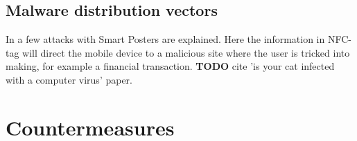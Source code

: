 

\subsection{Malware distribution vectors}
In \cite{10.1109/ARES.2009.46} a few attacks with Smart Posters are explained.
Here the information in NFC-tag will direct the mobile device to a malicious site where the user is tricked into making, for example a financial transaction.
\textbf{TODO} cite 'is your cat infected with a computer virus' paper.

\section{Countermeasures}



